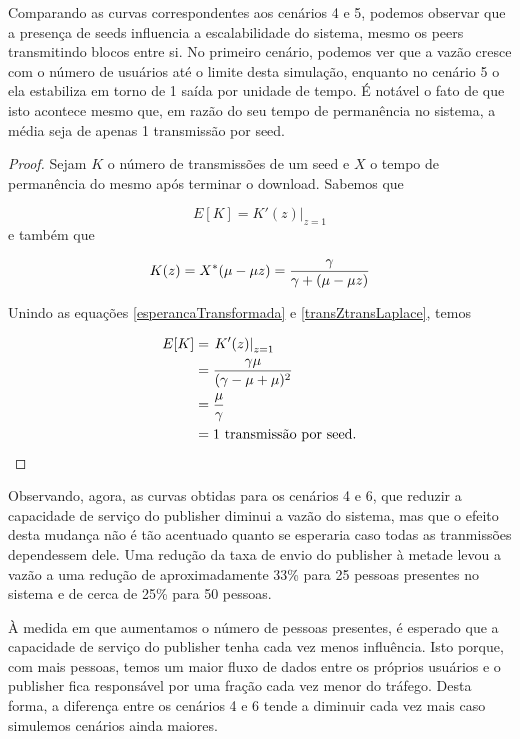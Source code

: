 \documentclass[a4paper,10pt]{article}
\begin{document}
Comparando as curvas correspondentes aos cenários 4 e 5, podemos observar que a presença de seeds influencia a escalabilidade do sistema, mesmo os peers transmitindo blocos entre si. No primeiro cenário, podemos ver que a vazão cresce com o número de usuários até o limite desta simulação, enquanto no cenário 5 o ela estabiliza em torno de 1 saída por unidade de tempo. É notável o fato de que isto acontece mesmo que, em razão do seu tempo de permanência no sistema, a média seja de apenas 1 transmissão por seed.

\begin{proof}

Sejam $K$ o número de transmissões de um seed e $X$ o tempo de permanência do mesmo após terminar o download. Sabemos que

\begin{equation}\label{esperancaTransformada}
	E[K] =\left. K'(z) \right |_{z = 1}
\end{equation}
e também que

\begin{equation}\label{transZtransLaplace}
	K(z) = X^*(\mu - \mu z) = {{\gamma} \over {\gamma + (\mu - \mu z)}}
\end{equation}

Unindo as equações \ref{esperancaTransformada} e \ref{transZtransLaplace}, temos

\begin{align}
	E[K] &= \left. K'(z) \right |_{z = 1} \\
	&= {{\gamma \mu} \over {(\gamma - \mu + \mu)^2}} \\
	&= {{\mu} \over {\gamma}} \\
	&= 1 \text{ transmissão por seed.}
\end{align}
\end{proof}

Observando, agora, as curvas obtidas para os cenários 4 e 6, que reduzir a capacidade de serviço do publisher diminui a vazão do sistema, mas que o efeito desta mudança não é tão acentuado quanto se esperaria caso todas as tranmissões dependessem dele. Uma redução da taxa de envio do publisher à metade levou a vazão a uma redução de aproximadamente 33\% para 25 pessoas presentes no sistema e de cerca de 25\% para 50 pessoas.

À medida em que aumentamos o número de pessoas presentes, é esperado que a capacidade de serviço do publisher tenha cada vez menos influência. Isto porque, com mais pessoas, temos um maior fluxo de dados entre os próprios usuários e o publisher fica responsável por uma fração cada vez menor do tráfego. Desta forma, a diferença entre os cenários 4 e 6 tende a diminuir cada vez mais caso simulemos cenários ainda maiores.
\end{document}
